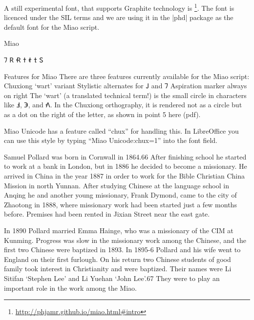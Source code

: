 A still experimental font, that supports Graphite technology is \footnote{\url{http://phjamr.github.io/miao.html\#intro}}. The font is licenced under the SIL terms and we are using it in the |phd| package as the default font for the Miao script.



\begin{scriptexample}[]{Miao}
\end{scriptexample}

{\miao 𖼴	𖼵	𖼶	𖼷	𖼸	𖼹	𖼺	}

Features for Miao
There are three features currently available for the Miao script:
\bgroup
\miao
Chuxiong ‘wart’ variant
Stylistic alternates for 𖼳 and 𖼴
Aspiration marker always on right
The ‘wart’ (a translated technical term!) is the small circle in characters like 𖼁, 𖼅, and 𖼾. In the Chuxiong orthography, it is rendered not as a circle but as a dot on the right of the letter, as shown in point 5 here (pdf).

Miao Unicode has a feature called “chux” for handling this. In LibreOffice you can use this style by typing “Miao Unicode:chux=1” into the font field.


Samuel Pollard was born in Cornwall in 1864.66 After finishing school he
started to work at a bank in London, but in 1886 he decided to become a
missionary. He arrived in China in the year 1887 in order to work for the
Bible Christian China Mission in north Yunnan. After studying Chinese at
the language school in Anqing he and another young missionary, Frank
Dymond, came to the city of Zhaotong in 1888, where missionary work
had been started just a few months before. Premises had been rented in
Jixian Street near the east gate.

In 1890 Pollard married Emma Hainge, who was a missionary of the
CIM at Kunming. Progress was slow in the missionary work among the
Chinese, and the first two Chinese were baptized in 1893. In 1895-6
Pollard and his wife went to England on their first furlough. On his return
two Chinese students of good family took interest in Christianity and were
baptized. Their names were Li Sitifan ‘Stephen Lee’ and Li Yuehan
‘John Lee’.67 They were to play an important role in the work
among the Miao.









